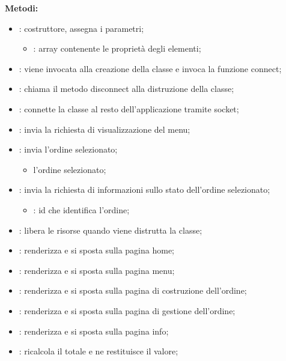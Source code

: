 \textbf{Metodi:}
\begin{itemize}
	\item {}: costruttore, assegna i parametri;
		\begin{itemize}
			\item {}: array contenente le proprietà degli elementi;
		\end{itemize}
	\item {}: viene invocata alla creazione della classe e invoca la funzione connect;
	\item {}: chiama il metodo disconnect alla distruzione della classe;
	\item {}: connette la classe al resto dell'applicazione tramite socket;
	\item {}: invia la richiesta di visualizzazione del menu;
	\item {}: invia l'ordine selezionato;
		\begin{itemize}
			\item {} l'ordine selezionato;
		\end{itemize}
	\item {}: invia la richiesta di informazioni sullo stato dell'ordine selezionato;
		\begin{itemize}
			\item {}: id che identifica l'ordine;
		\end{itemize}
	\item {}: libera le risorse quando viene distrutta la classe;
	\item {}: renderizza e si sposta sulla pagina home;
	\item {}: renderizza e si sposta sulla pagina menu;
	\item {}: renderizza e si sposta sulla pagina di costruzione dell'ordine;
	\item {}: renderizza e si sposta sulla pagina di gestione dell'ordine; 
	\item {}: renderizza e si sposta sulla pagina info;
	\item {}: ricalcola il totale e ne restituisce il valore;

\end{itemize}
